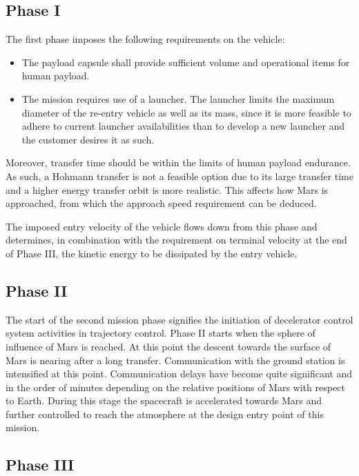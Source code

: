 \subsection{Phase I}\label{sec:p1}
The first phase imposes the following requirements on the vehicle:
\begin{itemize}
\item The payload capsule shall provide sufficient volume and operational items for human payload. %
\item  The mission requires use of a launcher. The launcher limits the maximum diameter of the re-entry vehicle as well as its mass, since it is more feasible to adhere to current launcher availabilities than to develop a new launcher and the customer desires it as such.
\end{itemize}
Moreover, transfer time should be within the limits of human payload endurance. As such, a Hohmann transfer is not a feasible option due to its large transfer time and a higher energy transfer orbit is more realistic. This affects how Mars is approached, from which the approach speed requirement can be deduced.

The imposed entry velocity of the vehicle flows down from this phase and determines, in combination with the requirement on terminal velocity at the end of Phase III, the kinetic energy to be dissipated by the entry vehicle.
\subsection{Phase II}\label{sec:p2}
The start of the second mission phase signifies the initiation of decelerator control system activities in trajectory control. Phase II starts when the sphere of influence of Mars is reached.  At this point the descent towards the surface of Mars is nearing after a long transfer. Communication with the ground station is intensified at this point. Communication delays have become quite significant and in the order of minutes depending on the relative positions of Mars with respect to Earth. During this stage the spacecraft is accelerated towards Mars and further controlled to reach the atmosphere at the design entry point of this mission.

\subsection{Phase III}\label{sec:p3}

